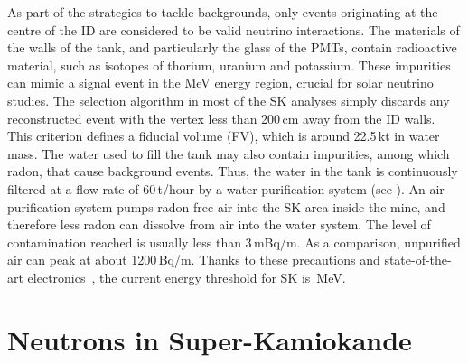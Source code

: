 As part of the strategies to tackle backgrounds, only events originating at the centre %
of the ID are considered to be valid neutrino interactions.
The materials of the walls of the tank, and particularly the glass of the PMTs, contain radioactive material, %
such as isotopes of thorium, uranium and potassium.
These impurities can mimic a signal event in the MeV energy region, crucial for solar neutrino studies.
The selection algorithm in most of the SK analyses simply discards any reconstructed event %
with the vertex less than 200\,cm away from the ID walls.
This criterion defines a fiducial volume (FV), which is around 22.5\,kt in water mass.
The water used to fill the tank may also contain impurities, among which radon, that cause background events.
Thus, the water in the tank is continuously filtered at a flow rate of 60\,t/hour by a water purification system (see ).
An air purification system pumps radon-free air into the SK area inside the mine, %
and therefore less radon can dissolve from air into the water system.
The level of contamination reached is usually less than 3\,mBq/m.
As a comparison, unpurified air can peak at about 1200\,Bq/m.
Thanks to these precautions and state-of-the-art electronics~\cite{Nishino:2009zu}, the current energy threshold for SK is \,MeV.


\section{Neutrons in Super-Kamiokande}
\label{sec:sk_neutron}

